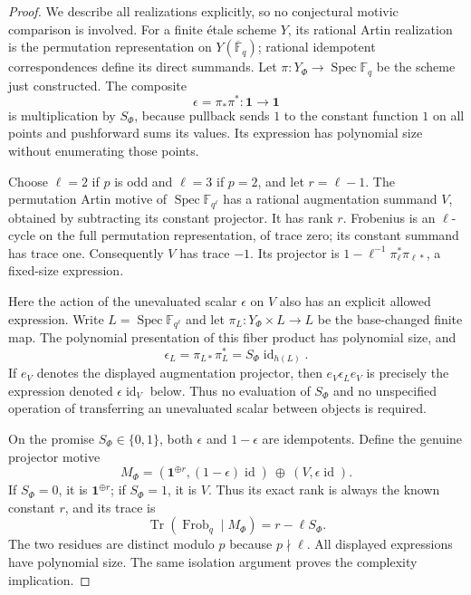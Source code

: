 \begin{proof}
We describe all realizations explicitly, so no conjectural
motivic comparison is involved.  For a finite \'etale scheme
$Y$, its rational Artin realization is the permutation
representation on $Y(\overline{\mathbb F}_q)$; rational
idempotent correspondences define its direct summands.
Let $\pi:Y_\Phi\to\operatorname{Spec}\mathbb F_q$ be the
scheme just constructed.  The composite
\[
 \epsilon=\pi_*\pi^*:\mathbf1\longrightarrow\mathbf1
\]
is multiplication by $S_\Phi$, because pullback sends $1$ to
the constant function $1$ on all points and pushforward sums
its values.  Its expression has polynomial size without
enumerating those points.

Choose $\ell=2$ if $p$ is odd and $\ell=3$ if $p=2$, and let
$r=\ell-1$.  The permutation Artin motive of
$\operatorname{Spec}\mathbb F_{q^\ell}$ has a rational
augmentation summand $V$, obtained by subtracting its constant
projector.  It has rank $r$.  Frobenius is an $\ell$-cycle on
the full permutation representation, of trace zero; its
constant summand has trace one.  Consequently $V$ has trace
$-1$.  Its projector is
$1-\ell^{-1}\pi_\ell^*\pi_{\ell *}$, a fixed-size expression.

Here the action of the unevaluated scalar $\epsilon$ on $V$
also has an explicit allowed expression.  Write
$L=\operatorname{Spec}\mathbb F_{q^\ell}$ and let
$\pi_L:Y_\Phi\times L\to L$ be the base-changed finite map.
The polynomial presentation of this fiber product has
polynomial size, and
\[
 \epsilon_L=\pi_{L*}\pi_L^*
       =S_\Phi\operatorname{id}_{h(L)}.
\]
If $e_V$ denotes the displayed augmentation projector, then
$e_V\epsilon_L e_V$ is precisely the expression denoted
$\epsilon\operatorname{id}_V$ below.  Thus no evaluation of
$S_\Phi$ and no unspecified operation of transferring an
unevaluated scalar between objects is required.

On the promise $S_\Phi\in\{0,1\}$, both $\epsilon$ and
$1-\epsilon$ are idempotents.  Define the genuine projector
motive
\[
 M_\Phi=
 (\mathbf1^{\oplus r},(1-\epsilon)\operatorname{id})
 \ \oplus\ (V,\epsilon\operatorname{id}).
\]
If $S_\Phi=0$, it is $\mathbf1^{\oplus r}$; if $S_\Phi=1$,
it is $V$.  Thus its exact rank is always the known constant
$r$, and its trace is
\[
 \operatorname{Tr}(\operatorname{Frob}_q\mid M_\Phi)
       =r-\ell S_\Phi.
\]
The two residues are distinct modulo $p$ because $p\nmid\ell$.
All displayed expressions have polynomial size.  The same
isolation argument proves the complexity implication.
\end{proof}

